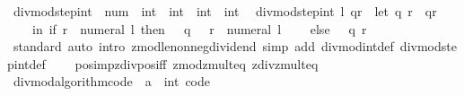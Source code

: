 \begin{isabellebody}
\isanewline
{}\isamarkupfalse%
\ divmod{\isacharunderscore}{\kern0pt}step{\isacharunderscore}{\kern0pt}int\ {\isacharcolon}{\kern0pt}{\isacharcolon}{\kern0pt}\ {\isachardoublequoteopen}num\ {\isasymRightarrow}\ int\ {\isasymtimes}\ int\ {\isasymRightarrow}\ int\ {\isasymtimes}\ int{\isachardoublequoteclose}\isanewline
{}\isanewline
\ \ {\isachardoublequoteopen}divmod{\isacharunderscore}{\kern0pt}step{\isacharunderscore}{\kern0pt}int\ l\ qr\ {\isacharequal}{\kern0pt}\ {\isacharparenleft}{\kern0pt}let\ {\isacharparenleft}{\kern0pt}q{\isacharcomma}{\kern0pt}\ r{\isacharparenright}{\kern0pt}\ {\isacharequal}{\kern0pt}\ qr\isanewline
\ \ \ \ in\ if\ r\ {\isasymge}\ numeral\ l\ then\ {\isacharparenleft}{\kern0pt}{}\ {\isacharasterisk}{\kern0pt}\ q\ {\isacharplus}{\kern0pt}\ {}{\isacharcomma}{\kern0pt}\ r\ {\isacharminus}{\kern0pt}\ numeral\ l{\isacharparenright}{\kern0pt}\isanewline
\ \ \ \ else\ {\isacharparenleft}{\kern0pt}{}\ {\isacharasterisk}{\kern0pt}\ q{\isacharcomma}{\kern0pt}\ r{\isacharparenright}{\kern0pt}{\isacharparenright}{\kern0pt}{\isachardoublequoteclose}\isanewline
\isanewline
{}\isamarkupfalse%
\isanewline
%
\isadelimproof
\ \ %
\endisadelimproof
%
\isatagproof
{}\isamarkupfalse%
\ standard\ {\isacharparenleft}{\kern0pt}auto\ intro{\isacharcolon}{\kern0pt}\ zmod{\isacharunderscore}{\kern0pt}le{\isacharunderscore}{\kern0pt}nonneg{\isacharunderscore}{\kern0pt}dividend\ simp\ add{\isacharcolon}{\kern0pt}\ divmod{\isacharunderscore}{\kern0pt}int{\isacharunderscore}{\kern0pt}def\ divmod{\isacharunderscore}{\kern0pt}step{\isacharunderscore}{\kern0pt}int{\isacharunderscore}{\kern0pt}def\isanewline
\ \ \ \ pos{\isacharunderscore}{\kern0pt}imp{\isacharunderscore}{\kern0pt}zdiv{\isacharunderscore}{\kern0pt}pos{\isacharunderscore}{\kern0pt}iff\ zmod{\isacharunderscore}{\kern0pt}zmult{}{\isacharunderscore}{\kern0pt}eq\ zdiv{\isacharunderscore}{\kern0pt}zmult{}{\isacharunderscore}{\kern0pt}eq{\isacharparenright}{\kern0pt}%
\endisatagproof
{\isafoldproof}%
%
\isadelimproof
\isanewline
%
\endisadelimproof
\isanewline
{}\isamarkupfalse%
\isanewline
\isanewline
{}\isamarkupfalse%
\ divmod{\isacharunderscore}{\kern0pt}algorithm{\isacharunderscore}{\kern0pt}code\ {\isacharbrackleft}{\kern0pt}\ {\isacharquery}{\kern0pt}{\isacharprime}{\kern0pt}a\ {\isacharequal}{\kern0pt}\ int{\isacharcomma}{\kern0pt}\ code{\isacharbrackright}{\kern0pt}\isanewline
\isanewline
{}\isamarkupfalse%

\end{isabellebody}
